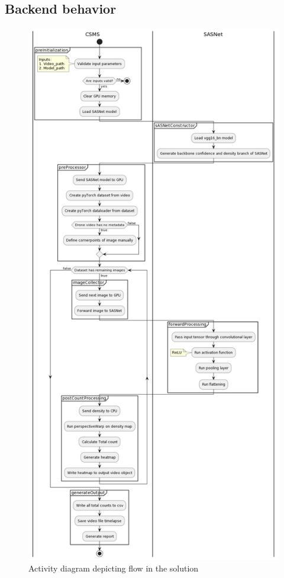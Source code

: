 \documentclass[
]{article}
\begin{document}
\hypertarget{backend-behavior}{%
\subsection{Backend behavior}\label{backend-behavior}}

\begin{figure}

{\centering \includegraphics{../images/activity-diagram-1.png}

}

\caption{\label{fig-activity-diagram}Activity diagram depicting flow in
the solution}

\end{figure}
\end{document}
